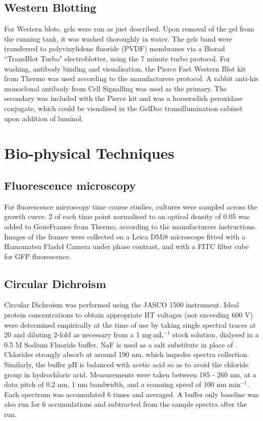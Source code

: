 \subsection{Western Blotting}
For Western blots, gels were run as just described. Upon removal of the gel from the running tank, it was washed thoroughly in water. The gels band were transferred to polyvinylidene fluoride (PVDF) membranes via a Biorad ``TransBlot Turbo" electroblotter, using the 7 minute turbo protocol. For washing, antibody binding and visualisation, the Pierce Fast Western Blot kit from Thermo was used according to the manufacturers protocol. A rabbit anti-his monoclonal antibody from Cell Signalling was used as the primary. The secondary was included with the Pierce kit and was a horseradish peroxidase conjugate, which could be visualised in the GelDoc transillumination cabinet upon addition of luminol.


\section{Bio-physical Techniques}
\subsection{Fluorescence microscopy}
For fluorescence microscopy time course studies, cultures were sampled across the growth curve. 2\ul{} of each time point normalised to an optical density of 0.05 was added to GeneFrames from Thermo, according to the manufacturers instructions. Images of the frames were collected on a Leica DMi8 microscope fitted with a Hamamatsu Flash4 Camera under phase contrast, and with a FITC filter cube for GFP fluorescence.


\subsection{Circular Dichroism}
	Circular Dichroism was performed using the JASCO 1500 instrument. Ideal protein concentrations to obtain appropriate HT voltages (not exceeding 600 V) were determined empirically at the time of use by taking single spectral traces at 20\degC{} and diluting 2-fold as necessary from a 1 $\mathrm{mg\ mL}^{-1}$ stock solution, dialysed in a 0.5 M Sodium Fluoride buffer. NaF is used as a salt substitute in place of \NaCl. Chlorides strongly absorb at around 190 nm, which impedes spectra collection. Similarly, the buffer pH is balanced with acetic acid so as to avoid the chloride group in hydrochloric acid. Measurements were taken between 185 - 260 nm, at a data pitch of 0.2 nm, 1 nm bandwidth, and a scanning speed of 100 nm min$^{-1}$. Each spectrum was accumulated 6 times and averaged. A buffer only baseline was also run for 6 accumulations and subtracted from the sample spectra after the run.

